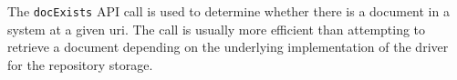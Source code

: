 The \verb+docExists+ API call is used to determine whether there is a document
in a \Rapture system at a given uri. The call is usually more efficient than
attempting to retrieve a document depending on the underlying implementation
of the driver for the repository storage.
